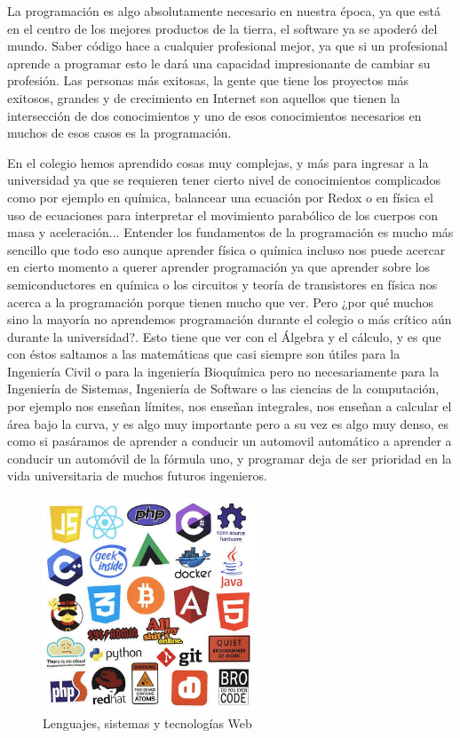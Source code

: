 \documentclass[twocolumns,a4paper]{IEEEtran}
\begin{document}
La programación es algo absolutamente necesario en nuestra época, ya que está
en el centro de los mejores productos de la tierra, el software ya se apoderó
del mundo. Saber código hace a cualquier profesional mejor, ya que si un
profesional aprende a programar esto le dará una capacidad impresionante de
cambiar su profesión. Las personas más exitosas, la gente que tiene los
proyectos más exitosos, grandes y de crecimiento en Internet son aquellos que
tienen la intersección de dos conocimientos y uno de esos conocimientos
necesarios en muchos de esos casos es la programación.

En el colegio hemos aprendido cosas muy complejas, y más para ingresar a la
universidad ya que se requieren tener cierto nivel de conocimientos complicados
como por ejemplo en química, balancear una ecuación por Redox o en física el
uso de ecuaciones para interpretar el movimiento parabólico de los cuerpos con
masa y aceleración... Entender los fundamentos de la programación es mucho más
sencillo que todo eso aunque aprender física o química incluso nos puede
acercar en cierto momento a querer aprender programación ya que aprender sobre
los semiconductores en química o los circuitos y teoría de transistores en
física nos acerca a la programación porque tienen mucho que ver. Pero ¿por qué
muchos sino la mayoría no aprendemos programación durante el colegio o más
crítico aún durante la universidad?. Esto tiene que ver con el Álgebra y el
cálculo, y es que con éstos saltamos a las matemáticas que casi siempre son
útiles para la Ingeniería Civil o para la ingeniería Bioquímica pero no
necesariamente para la Ingeniería de Sistemas, Ingeniería de Software o las
ciencias de la computación, por ejemplo nos enseñan límites, nos enseñan
integrales, nos enseñan a calcular el área bajo la curva, y es algo muy
importante pero a su vez es algo muy denso, es como si pasáramos de aprender a
conducir un automovil automático a aprender a conducir un automóvil de la
fórmula uno, y programar deja de ser prioridad en la vida universitaria de
muchos futuros ingenieros.


\begin{figure}[t!]
   \centering
      \includegraphics[width=2.5in]{./pictures/tec_web.jpg}
   \caption{Lenguajes, sistemas y tecnologías Web}
   \label{fig:tecnologia_web}
\end{figure}
\end{document}
